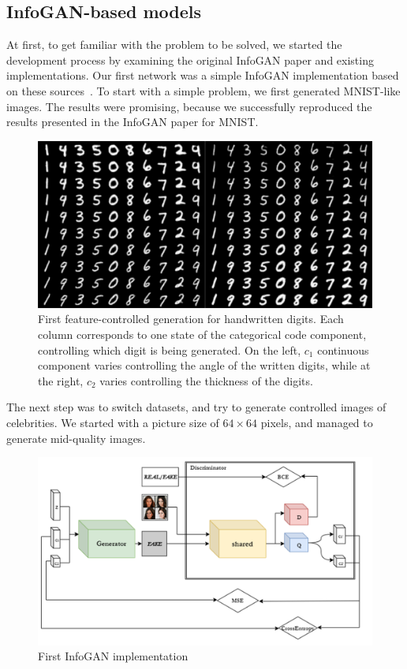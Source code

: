 \documentclass{egpubl}
\begin{document}
\subsection{InfoGAN-based models}

At first, to get familiar with the problem %
to be solved, %
we started the development process by %
examining the original InfoGAN paper and existing implementations. Our first network was a simple InfoGAN implementation based on these sources~\cite{chen2016infogan}. To start with%
a simple problem, %
we first generated MNIST-like images. The results were promising, because we successfully reproduced the results presented in the InfoGAN paper for MNIST.

\begin{figure}[!htb]
	\centering
	\includegraphics[width=1\linewidth]{pic/mnist}
	\caption{First feature-controlled generation for handwritten digits. Each column corresponds to one state of the categorical code component, controlling which digit is being generated. On the left, $c_1$ continuous component varies controlling the angle of the written digits, while at the right, $c_2$ varies controlling the thickness of the digits.}
	\label{fig:mnist_results}
\end{figure}

The next step was to switch datasets, %
and %
try to generate controlled images of celebrities. We started with a picture size of $64\times 64$ pixels, %
and managed to generate mid-quality images.

\begin{figure}[!htb]
	\centering
	\includegraphics[width=\linewidth]{pic/1}
	\caption{First InfoGAN implementation}
	\label{fig:infogan}
\end{figure}
\end{document}
